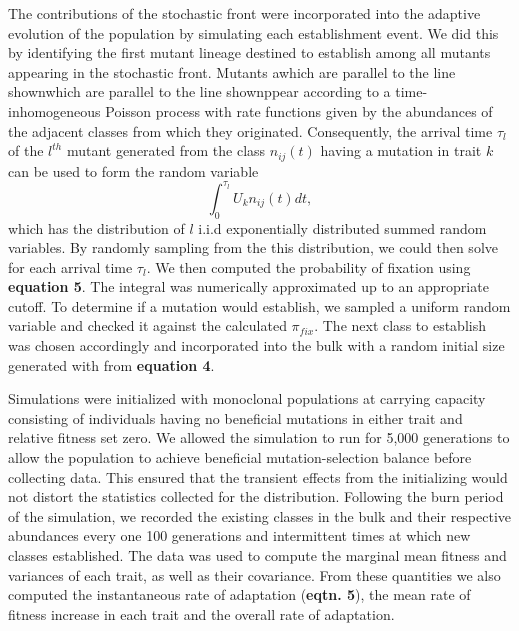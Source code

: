 \documentclass[11pt,twocolumn]{article}
\begin{document}
The contributions of the stochastic front were incorporated into the adaptive evolution of the population by simulating each establishment event.  We did this by identifying the first mutant lineage destined to establish among all mutants appearing in the stochastic front.  Mutants awhich are parallel to the line shownwhich are parallel to the line shownppear according to a time-inhomogeneous Poisson process with rate functions given by the abundances of the adjacent classes from which they originated. Consequently, the arrival time $\tau_l$ of the $l^{th}$ mutant generated from the class $n_{ij}(t)$ having a mutation in trait $k$ can be used to form the random variable
% 
% 
\[ 
\int_0^{\tau_l} U_k n_{ij}(t) dt ,
\] 
which has the distribution of $l$ i.i.d exponentially distributed summed random variables. By randomly sampling from the this distribution, we could then solve for each arrival time $\tau_l$.   We then computed the probability of fixation using \textbf{equation 5}.  The integral was numerically approximated up to an appropriate cutoff.  To determine if a mutation would establish, we sampled a uniform random variable and checked it against the calculated $\pi_{fix}$. The next class to establish was chosen accordingly and incorporated into the bulk with a random initial size generated with from \textbf{equation 4}.\par
% 
% 

Simulations were initialized with monoclonal populations at carrying capacity consisting of individuals having no beneficial mutations in either trait and relative fitness set zero. We allowed the simulation to run for 5,000 generations to allow the population to achieve beneficial mutation-selection balance before collecting data. This ensured that the transient effects from the initializing would not distort the statistics collected for the distribution. Following the burn period of the simulation, we recorded the existing classes in the bulk and their respective abundances every one 100 generations and intermittent times at which new classes established. The data was used to compute the marginal mean fitness and variances of each trait, as well as their covariance. From these quantities we also computed the instantaneous rate of adaptation (\textbf{eqtn. 5}), the mean rate of fitness increase in each trait and the overall rate of adaptation.
\end{document}
